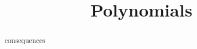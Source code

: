 \documentclass{ximera}
\title{Polynomials}
\begin{document}
\begin{abstract}
consequences
\end{abstract}
\maketitle
\end{document}
